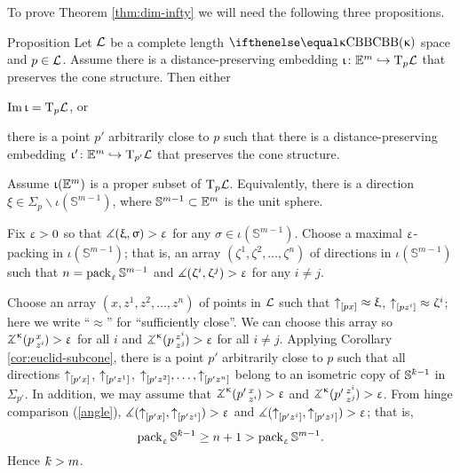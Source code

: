 To prove Theorem \ref{thm:dim-infty}  we will need the following three propositions.


\begin{thm}{Proposition}\label{E=T}
Let $\mathcal{L}$ be a complete length $\Alex{\kappa}$ space and $p\in \spc{L}$.
Assume there is a distance-preserving embedding $\iota\:\EE^{m}\hookrightarrow \T_p\spc{L}$ 
that preserves the cone structure.
Then either
\begin{subthm}{}
 $\mathop{\rm Im}\nolimits\upiota=\text{\rm T}_p\mathcal{L}$, or
\end{subthm}

\begin{subthm}{} there is a point $p'$ arbitrarily close to $p$ such that there is a distance-preserving embedding $\iota'\:\EE^{m}\hookrightarrow \T_{p'}\spc{L}$ 
that preserves the cone structure.
\end{subthm}
\end{thm}


Assume $\upiota(\mathbb{E}^{m})$ is a proper subset of $\text{\rm T}_p\mathcal{L}$.
Equivalently, there is a direction $\xi \in \Sigma_p\backslash\iota(\mathbb{S}^{m-1})$,
where $\mathbb{S}^{m-1}\subset \EE^m$ is the unit sphere. 

Fix $\upvarepsilon>0$ so that $\measuredangle(\upxi,\upsigma)>\upvarepsilon$ for any $\sigma\in \iota(\mathbb{S}^{m-1})$. 
Choose a maximal $\upvarepsilon$-packing in $\iota(\mathbb{S}^{m-1})$;
that is, an array  $(\zeta^1,\zeta^2,\dots,\zeta^n)$ of directions in $\iota(\mathbb{S}^{m-1})$ such that $n=\mathop{\rm pack}\nolimits_\upvarepsilon \mathbb{S}^{m-1}$ and $\measuredangle(\upzeta^i,\upzeta^j)>\upvarepsilon$ for any $i\not=j$.

Choose an array $(x,z^1,z^2,\dots,z^n)$  of points in $\mathcal{L}$ such that
$\dir p x\approx\xi$, $\dir p{z^i}\approx\zeta^i$; 
here we write ``$\approx$'' for ``sufficiently close''.
We can choose this array so 
$\angk{\kappa}p x{z^i}>\eps$ for all $i$ 
and $\angk{\kappa}p{z^i}{z^j}>\eps$ for all $i\not=j$.
Applying Corollary \ref{cor:euclid-subcone}, there is a point $p'$ arbitrarily close to  $p$ 
such that all directions ${\uparrow}_{[{p'}{x}]}$, ${\uparrow}_{[{p'}{z^1}]}$, $\dir{p'}{z^2},\dots,\dir{p'}{z^n}$
belong to an isometric copy of $\mathbb{S}^{\kay-1}$ in $\Sigma_{p'}$.
In addition, we may assume that $\angk{\kappa}{p'}x{z^i}>\eps$ and $\angk{\kappa}{p'}{z^i}{z^j}>\eps$.
From hinge comparison (\ref{angle}),
$\measuredangle({\uparrow}_{[{p'}{x}]},{\uparrow}_{[{p'}{z^i}]})>\upvarepsilon$ 
and $\measuredangle({\uparrow}_{[{p'}{z^i}]},{\uparrow}_{[{p'}{z^j}]})>\upvarepsilon$;
that is, 
\[\pack_\eps \mathbb{S}^{\kay-1}\ge n+1>\pack_\eps \mathbb{S}^{m-1}.\] 
Hence $\kay>m$.
\qeds


